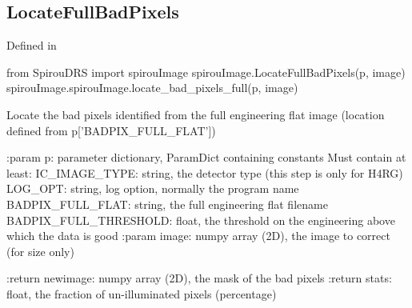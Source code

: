 \noindent\begin{minipage}{\textwidth}
\subsection{LocateFullBadPixels}

Defined in \spirouImage{}

\begin{pythonbox}
from SpirouDRS import spirouImage
spirouImage.LocateFullBadPixels(p, image)
spirouImage.spirouImage.locate_bad_pixels_full(p, image)
\end{pythonbox}

\begin{pythondocstring}
Locate the bad pixels identified from the full engineering flat image
(location defined from p['BADPIX_FULL_FLAT'])

:param p: parameter dictionary, ParamDict containing constants
    Must contain at least:
        IC_IMAGE_TYPE: string, the detector type (this step is only for
                       H4RG)
        LOG_OPT: string, log option, normally the program name
        BADPIX_FULL_FLAT: string, the full engineering flat filename
        BADPIX_FULL_THRESHOLD: float, the threshold on the engineering
                               above which the data is good
:param image: numpy array (2D), the image to correct (for size only)

:return newimage: numpy array (2D), the mask of the bad pixels
:return stats: float, the fraction of un-illuminated pixels (percentage)
\end{pythondocstring}
\end{minipage}


